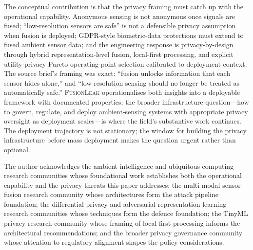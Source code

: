 \documentclass[sigconf,nonacm]{acmart}
\begin{document}
The conceptual contribution is that the privacy framing must
catch up with the operational capability. Anonymous sensing is
not anonymous once signals are fused; ``low-resolution sensors are
safe'' is not a defensible privacy assumption when fusion is
deployed; GDPR-style biometric-data protections must extend to
fused ambient sensor data; and the engineering response is
privacy-by-design through hybrid representation-level fusion,
local-first processing, and explicit utility-privacy Pareto
operating-point selection calibrated to deployment context. The
source brief's framing was exact: ``fusion unlocks information
that each sensor hides alone,'' and ``low-resolution sensing
should no longer be treated as automatically safe.''
\textsc{FusionLeak} operationalises both insights into a
deployable framework with documented properties; the broader
infrastructure question---how to govern, regulate, and deploy
ambient-sensing systems with appropriate privacy oversight as
deployment scales---is where the field's substantive work
continues. The deployment trajectory is not stationary; the window
for building the privacy infrastructure before mass deployment
makes the question urgent rather than optional.

\begin{acks}
The author acknowledges the ambient intelligence and ubiquitous
computing research communities whose foundational work establishes
both the operational capability and the privacy threats this paper
addresses; the multi-modal sensor fusion research community whose
architectures form the attack pipeline foundation; the differential
privacy and adversarial representation learning research communities
whose techniques form the defence foundation; the TinyML privacy
research community whose framing of local-first processing
informs the architectural recommendations; and the broader privacy
governance community whose attention to regulatory alignment shapes
the policy considerations.
\end{acks}
\end{document}
